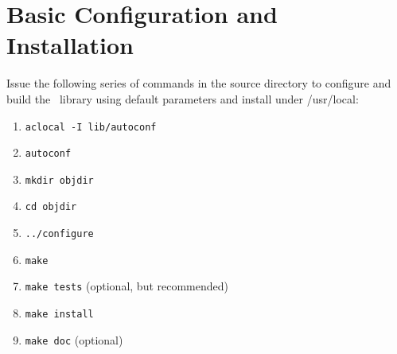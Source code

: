 \documentclass[12pt]{article}
\begin{document}
\section{Basic Configuration and Installation}

Issue the following series of commands in the source directory to configure and build the \LIBINT\
library using default parameters and install under /usr/local:

\begin{enumerate}
\item {\tt aclocal -I lib/autoconf}
\item {\tt autoconf}
\item {\tt mkdir objdir}
\item {\tt cd objdir}
\item {\tt ../configure}
\item {\tt make}
\item {\tt make tests} (optional, but recommended)
\item {\tt make install}
\item {\tt make doc} (optional)
\end{enumerate}
\end{document}

